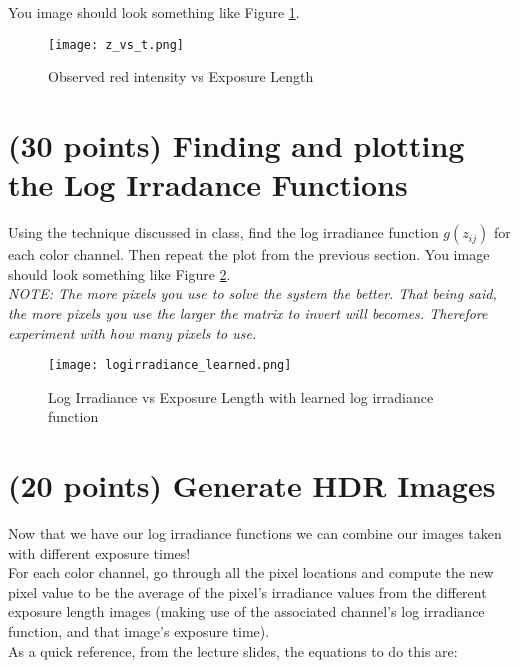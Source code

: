 \documentclass[12pt]{article}
\begin{document}
\noindent
You image should look something like Figure \ref{fig1}.

\begin{figure}[H]
\begin{center}
\texttt{[image: z\_vs\_t.png]}
\caption{Observed red intensity vs Exposure Length}
\label{fig1}
\end{center}
\end{figure}

\newpage

\section{(30 points) Finding and plotting the Log Irradance Functions}
Using the technique discussed in class, find the log irradiance function $g(z_{ij})$ for each color channel.  Then repeat the plot from the previous section.  You image should look something like Figure \ref{fig2}.\\

\noindent
\emph{NOTE:  The more pixels you use to solve the system the better.  That being said, the more pixels you use the larger the matrix to invert will becomes.   Therefore experiment with how many pixels to use.}

\begin{figure}[H]
\begin{center}
\texttt{[image: logirradiance\_learned.png]}
\caption{Log Irradiance vs Exposure Length with learned log irradiance function}
\label{fig2}
\end{center}
\end{figure}

\newpage

\section{(20 points) Generate HDR Images}
Now that we have our log irradiance functions we can combine our images taken with different exposure times!\\

\noindent
For each color channel, go through all the pixel locations and compute the new pixel value to be the average of the pixel's irradiance values from the different exposure length images (making use of the associated channel's log irradiance function, and that image's exposure time).\\  

\noindent
As a quick reference, from the lecture slides, the equations to do this are:
\end{document}
